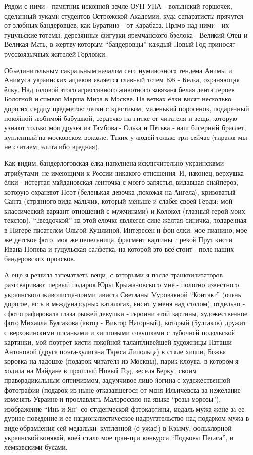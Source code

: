 Рядом с ними - памятник исконной земле ОУН-УПА - волынский горшочек, сделанный
руками студентов Острожской Академии, куда сепаратисты прячутся от злобных
бандеровцев, как Буратино - от Карабаса. Прямо над ними - их гуцульские тотемы:
деревянные фигурки яремчанского брелока - Великий Отец и Великая Мать, в жертву
которым \enquote{бандеровцы} каждый Новый Год приносят русскоязычных жителей Горловки. 

Объединительным сакральным началом сего нуминозного тендема Анимы и Анимуса
украинских ацтеков является главный тотем БЖ - Белка, охраняющая ёлку. Над
головой этого агрессивного животного завязана белая лента героев Болотной и
символ Марша Мира в Москве. На ветках ёлки висят несколько дорогих сердцу
предметов: четки с крестиком, маленький поросенок, подаренный покойной любимой
бабушкой, сердечко на нитке от читателя и вещь, которую узнают только мои
друзья из Тамбова - Олька и Петька - наш бисерный браслет, купленный на
московском вокзале. Таких у людей только три сейчас (тиражи мы не считаем,
элита ибо вредная). 

Как видим, бандерлоговская ёлка наполнена исключительно украинскими атрибутами,
не имеющими к России никакого отношения. И, наконец, верхушка ёлки - истертая
майдановская ленточка с моего запястья, видавшая снайперов, которую охраняют
Поэт (беленькая девочка ,похожая на Ангела), кривоватый Санта (странного вида
мальчик, который меньше и слабее своей Герды: мой классический вариант
отношений с мужчинами) и Колокол (главный герой моих текстов). \enquote{Звездочкой} на
этой елочке является сине-желтая синичка, подаренная в Питере писателем Ольгой
Кушлиной. Интересен и фон елки: мое пианино, мое же детское фото, моя же
пепельница, фрагмент картины с рекой Прут кисти Ивана Попова и гуцульская
салфетка, на которой это всё стоит - поле наших бандеровских происков.

А еще я решила запечатлеть вещи, с которыми я после транквилизаторов
разговариваю: первый подарок Юры Крыжановского мне - полотно известного
украинского живописца-примитивиста Светланы Мурованной \enquote{Контакт} (очень
дорогое, есть в международных каталогах, висит у меня над столом), отдельно -
сфотографировала глаза рыжей девушки - героини этой картины, художественное
фото Михаила Булгакова (автор - Виктор Нагорный), который (Булгаков) дружит с
верховинскими писанками и хипповыми совушками с лубочной подольской картинки,
мой портрет кисти покойной талантливейшей художницы Наташи Антоновой (друга
поэта-хулигана Тараса Липольца) в стиле хиппи, Божья коровка на ладошке
(подарок читателя из Москвы), парик клоуна, в котором я ходила на Майдане в
прошлый Новый Год, веселя Беркут своим праворадикальным оптимизмом, задумчивое
лицо йогина с художественной фотографии (подарок из ныне отказавшегося от меня
Ильичевска за нежелание изменять Украине и прославлять Малороссию на языке
\enquote{розы-морозы}), изображение \enquote{Инь и Ян} со студенческой фотокартины, медаль мужа
жене за ее дурное поведение и ее националистическое надругательство над
подарком мужа в виде обрамления сей медальки, купленной (о ужас!) в Крыму,
фольклорной украинской конякой, коей стало мое гран-при конкурса \enquote{Подковы
Пегаса}, и лемковскими бусами. 


